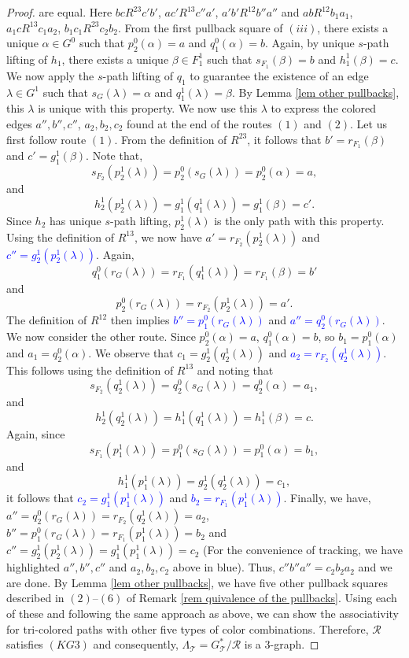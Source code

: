 \documentclass[a4paper,reqno,12pt]{amsart}
\theoremstyle{definition}
\theoremstyle{remark}
\begin{document}
\begin{proof}
are equal. Here $bc R^{23} c'b'$, $ac' R^{13} c''a'$, $a' b' R^{12}b'' a''$ and $ab R^{12} b_1 a_1$, $a_1 c R^{13} c_1 a_2$, $b_1 c_1 R^{23} c_2 b_2$. From the first pullback square of $(iii)$, there exists a unique $\alpha\in G^0$ such that $p_2^0(\alpha)=a$ and $q_1^0(\alpha)=b$. Again, by unique $s$-path lifting of $h_1$, there exists a unique $\beta\in F_1^1$ such that $s_{F_1}(\beta)=b$ and $h_1^1(\beta)=c$. We now apply the $s$-path lifting of $q_1$ to guarantee the existence of an edge $\lambda\in G^1$ such that $s_G(\lambda)=\alpha$ and $q_1^1(\lambda)=\beta$. By Lemma \ref{lem other pullbacks}, this $\lambda$ is unique with this property. We now use this $\lambda$ to express the colored edges $a'',b'',c''$, $a_2,b_2,c_2$ found at the end of the routes $(1)$ and $(2)$. Let us first follow route $(1)$. From the definition of $R^{23}$, it follows that $b'=r_{F_1}(\beta)$ and $c'=g_1^1(\beta)$. Note that, \[s_{F_2}(p_2^1(\lambda))=p_2^0(s_G(\lambda))=p_2^0(\alpha)=a,\] and \[h_2^1(p_2^1(\lambda))=g_1^1(q_1^1(\lambda))=g_1^1(\beta)=c'.\] Since $h_2$ has unique $s$-path lifting, $p_2^1(\lambda)$ is the only path with this property. Using the definition of $R^{13}$, we now have $a'=r_{F_2}(p_2^1(\lambda))$ and \textcolor{blue}{$c''=g_2^1(p_2^1(\lambda))$}. Again, \[q_1^0(r_G(\lambda))=r_{F_1}(q_1^1(\lambda))=r_{F_1}(\beta)=b'\] and \[p_2^0(r_G(\lambda))=r_{F_2}(p_2^1(\lambda))=a'.\] The definition of $R^{12}$ then implies \textcolor{blue}{$b''=p_1^0(r_G(\lambda))$} and \textcolor{blue}{$a''=q_2^0(r_G(\lambda))$}. We now consider the other route. Since $p_2^0(\alpha)=a$, $q_1^0(\alpha)=b$, so $b_1=p_1^0(\alpha)$ and $a_1=q_2^0(\alpha)$. We observe that $c_1=g_2^1(q_2^1(\lambda))$ and \textcolor{blue}{$a_2=r_{F_2}(q_2^1(\lambda))$}. This follows using the definition of $R^{13}$ and noting that \[s_{F_2}(q_2^1(\lambda))=q_2^0(s_G(\lambda))=q_2^0(\alpha)=a_1,\] and \[h_2^1(q_2^1(\lambda))=h_1^1(q_1^1(\lambda))=h_1^1(\beta)=c.\] Again, since \[s_{F_1}(p_1^1(\lambda))=p_1^0(s_G(\lambda))=p_1^0(\alpha)=b_1,\] and \[h_1^1(p_1^1(\lambda))=g_2^1(q_2^1(\lambda))=c_1,\] it follows that \textcolor{blue}{$c_2=g_1^1(p_1^1(\lambda))$} and \textcolor{blue}{$b_2=r_{F_1}(p_1^1(\lambda))$}. Finally, we have, $a''=q_2^0(r_G(\lambda))=r_{F_2}(q_2^1(\lambda))=a_2$, $b''=p_1^0(r_G(\lambda))=r_{F_1}(p_1^1(\lambda))=b_2$ and $c''=g_2^1(p_2^1(\lambda))=g_1^1(p_1^1(\lambda))=c_2$ (For the convenience of tracking, we have highlighted $a'',b'',c''$ and $a_2,b_2,c_2$ above in blue). Thus, $c''b''a''=c_2b_2a_2$ and we are done. By Lemma \ref{lem other pullbacks}, we have five other pullback squares described in $(2)$--$(6)$ of Remark \ref{rem quivalence of the pullbacks}. Using each of these and following the same approach as above, we can show the associativity for tri-colored paths with other five types of color combinations. Therefore, $\mathcal{R}$ satisfies $(KG3)$ and consequently, $\Lambda_{\mathcal{T}}=G_{\mathcal{T}}^*/\mathcal{R}$ is a $3$-graph. 


\end{proof}
\end{document}
